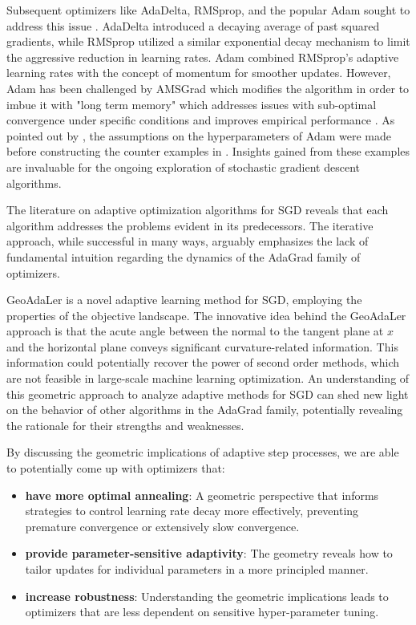 \documentclass{article}
\begin{document}
Subsequent optimizers like AdaDelta, RMSprop, and the popular Adam sought to address this issue \citep{kingma2014adam,Tieleman2012rmsprop,zeiler2012adadelta}. AdaDelta introduced a decaying average of past squared gradients, while RMSprop utilized a similar exponential decay mechanism to limit the aggressive reduction in learning rates. Adam combined RMSprop's adaptive learning rates with the concept of momentum for smoother updates. However, Adam has been challenged by AMSGrad which modifies the algorithm in order to imbue it with "long term memory" which addresses issues with sub-optimal convergence under specific conditions and improves empirical performance \citep{reddi2019convergence}. As pointed out by \citep{li2024convergence, shi2021rmsprop, zhang2022adam}, the assumptions on the hyperparameters of Adam were made before constructing the counter examples in \citep{reddi2019convergence}. Insights gained from these examples are invaluable for the ongoing exploration of stochastic gradient descent algorithms.

The literature on adaptive optimization algorithms for SGD reveals that each algorithm addresses the problems evident in its predecessors. The iterative approach, while successful in many ways, arguably emphasizes the lack of fundamental intuition regarding the dynamics of the AdaGrad family of optimizers.

GeoAdaLer is a novel adaptive learning method for SGD, employing the properties of the objective landscape. The innovative idea behind the GeoAdaLer approach is that the acute angle between the normal to the tangent plane at $x$ and the horizontal plane conveys significant curvature-related information. This information could potentially recover the power of second order methods, which are not feasible in large-scale machine learning optimization. An understanding of this geometric approach to analyze adaptive methods for SGD can shed new light on the behavior of other algorithms in the AdaGrad family, potentially revealing the rationale for their strengths and weaknesses.

By discussing the geometric implications of adaptive step processes, we are able to potentially come up with optimizers that:

\begin{itemize} %
    \item \textbf{have more optimal annealing}: A geometric perspective that informs strategies to control learning rate decay more effectively, preventing premature convergence or extensively slow convergence.
    \item \textbf{provide parameter-sensitive adaptivity}: The geometry reveals how to tailor updates for individual parameters in a more principled manner.
    \item \textbf{increase robustness}: Understanding the geometric implications  leads to optimizers that are less dependent on sensitive hyper-parameter tuning.
\end{itemize}
\end{document}

